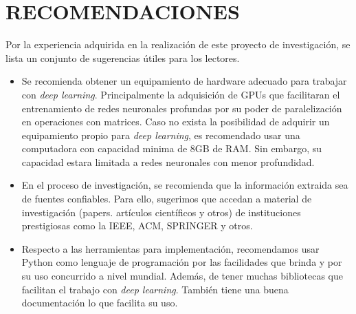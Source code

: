 \chapter*{RECOMENDACIONES}

Por la experiencia adquirida en la realización de este proyecto de investigación, se lista un conjunto de sugerencias útiles para los lectores.

\begin{itemize}


\item Se recomienda obtener un equipamiento de hardware adecuado para trabajar con \textit{deep learning}. Principalmente la adquisición de GPUs que facilitaran el entrenamiento de redes neuronales profundas por su poder de paralelización en operaciones con matrices. Caso no exista la posibilidad de adquirir un equipamiento propio para \textit{deep learning}, es recomendado usar una computadora con capacidad minima de 8GB  de RAM. Sin embargo, su capacidad estara limitada a redes neuronales con menor profundidad.

\item En el proceso de investigación, se recomienda que la información extraida sea de fuentes confiables. Para ello, sugerimos que accedan a material de investigación (papers. artículos científicos y otros) de instituciones prestigiosas como la IEEE, ACM, SPRINGER y otros.

\item Respecto a las herramientas para implementación,  recomendamos usar Python como lenguaje de programación por las facilidades que brinda y por su uso concurrido a nivel mundial. Además, de tener muchas bibliotecas que facilitan el trabajo con \textit{deep learning}. También tiene una buena documentación lo que facilita su uso. 

\end{itemize}